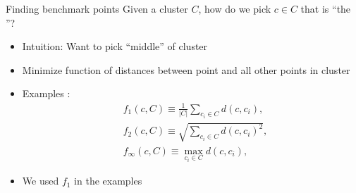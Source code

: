 \begin{frame}{Finding benchmark points}
	Given a cluster $C$, how do we pick $c\in C$ that is \enquote{the }?
	\begin{itemize}
		\item Intuition: Want to pick \enquote{middle} of cluster
		\item Minimize function of distances between point and all other points in cluster
		\item Examples :
		\begin{align*}%
		&f_1(c, C) \equiv \frac 1{|C|}\sum_{c_i\in C} d(c, c_i),\\
		&f_2(c, C) \equiv \sqrt{\sum_{c_i\in C} d(c, c_i)^2},\\
		&f_\infty(c, C) \equiv \max_{c_i\in C} d(c, c_i),
		\end{align*}
		\item We used $f_1$ in the examples
	\end{itemize}
	
	
\end{frame}
%
